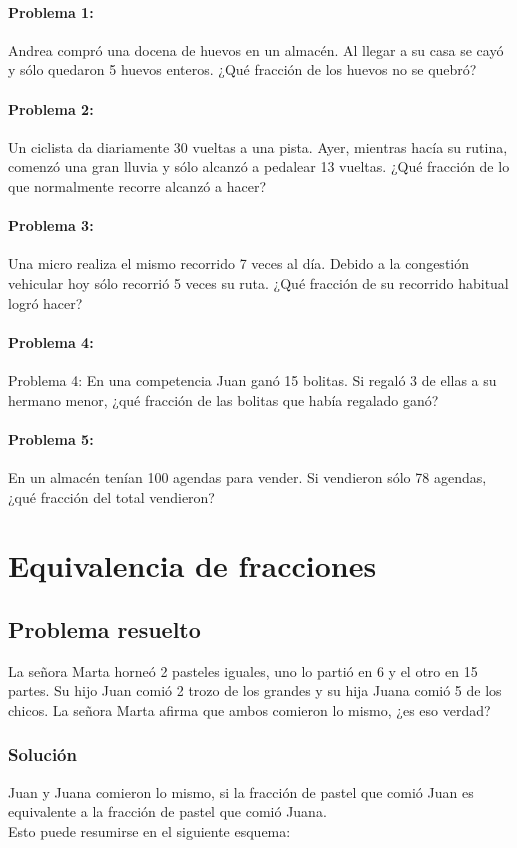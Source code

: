 \documentclass[10pt,twoside]{article}
\begin{document}
\paragraph*{Problema 1:} Andrea compró una docena de huevos en un almacén. Al llegar a su casa se cayó y sólo quedaron 5 huevos enteros. ¿Qué fracción de los huevos no se quebró?
\paragraph*{Problema 2:} Un ciclista da diariamente 30 vueltas a una pista. Ayer, mientras hacía su rutina, comenzó una gran lluvia y sólo alcanzó a pedalear 13 vueltas. ¿Qué fracción de lo que normalmente recorre alcanzó a hacer?
\paragraph*{Problema 3:} 
Una micro realiza el mismo recorrido 7 veces al día. Debido a la congestión vehicular hoy sólo recorrió 5 veces su ruta. ¿Qué fracción de su recorrido habitual logró hacer?
\paragraph*{Problema 4:} Problema 4:
En una competencia Juan ganó 15 bolitas. Si regaló 3 de ellas a su hermano menor, ¿qué fracción de las bolitas que había regalado ganó? 
\paragraph*{Problema 5:} En un almacén tenían 100 agendas para vender. Si vendieron sólo 78 agendas, ¿qué fracción
del total vendieron?
\section*{Equivalencia de fracciones}
\subsection*{Problema resuelto}
La señora Marta horneó 2 pasteles iguales, uno lo partió en 6 y el otro en 15 partes. Su hijo Juan comió 2 trozo de los grandes y su hija Juana comió 5 de los chicos. La señora Marta afirma que ambos comieron lo mismo, ¿es eso verdad?
\subsubsection*{Soluci\'{o}n}
Juan y Juana comieron lo mismo, si la fracción de pastel que comió Juan es equivalente a la fracción de pastel que comió Juana.\\
Esto puede resumirse en el siguiente esquema:
\end{document}
